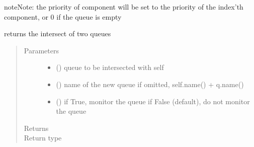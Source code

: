 \documentclass[letterpaper,10pt,english]{sphinxmanual}
\begin{document}
\begin{fulllineitems}
\begin{fulllineitems}
\begin{quote}
\begin{description}
\begin{itemize}
\end{itemize}

\end{description}\end{quote}

\begin{sphinxadmonition}{note}{Note:}
the priority of component will be set to the priority of the index’th component,
or 0 if the queue is empty
\end{sphinxadmonition}

\end{fulllineitems}


\begin{fulllineitems}
\label{\detokenize{Reference:salabim.Queue.intersection}}
returns the intersect of two queues
\begin{quote}\begin{description}
\item[{Parameters}] \leavevmode\begin{itemize}
\item {} 
 ({\hyperref[\detokenize{Reference:salabim.Queue}]{}}) \textendash{} queue to be intersected with self

\item {} 
 () \textendash{} name of the  new queue 
if omitted, self.name() + q.name()

\item {} 
 () \textendash{} if True, monitor the queue 
if False (default), do not monitor the queue

\end{itemize}

\item[{Returns}] \leavevmode
{}

\item[{Return type}] \leavevmode
{\hyperref[\detokenize{Reference:salabim.Queue}]{}}

\end{description}\end{quote}


\end{fulllineitems}
\end{fulllineitems}
\end{document}
